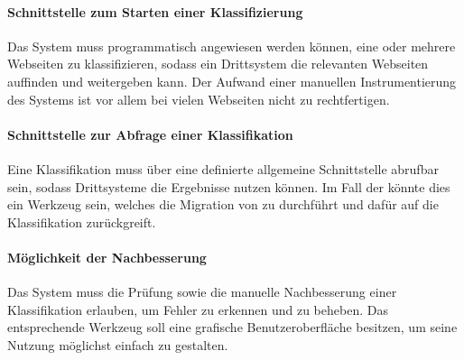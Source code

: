         \paragraph*{Schnittstelle zum Starten einer Klassifizierung}      
        Das System muss programmatisch angewiesen werden können,
        eine oder mehrere Webseiten zu klassifizieren,
        sodass ein Drittsystem die relevanten Webseiten auffinden
        und weitergeben kann.
        Der Aufwand einer manuellen Instrumentierung des Systems ist
        vor allem bei vielen Webseiten nicht zu rechtfertigen.

        \paragraph*{Schnittstelle zur Abfrage einer Klassifikation}
        Eine Klassifikation muss über eine definierte allgemeine
        Schnittstelle abrufbar sein, sodass Drittsysteme die Ergebnisse
        nutzen können.
        Im Fall der {\fernUni} könnte dies ein Werkzeug sein,
        welches die Migration von {\wordpress} zu {\imperia}
        durchführt und dafür auf die Klassifikation zurückgreift.

        \paragraph*{Möglichkeit der Nachbesserung}
        Das System muss die Prüfung sowie die manuelle Nachbesserung
        einer Klassifikation erlauben,
        um Fehler zu erkennen und zu beheben.
        Das entsprechende Werkzeug soll eine grafische Benutzeroberfläche
        besitzen, um seine Nutzung möglichst einfach zu gestalten.
